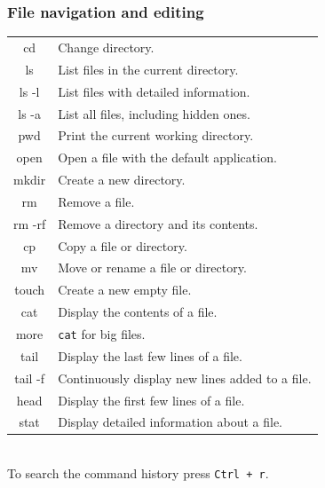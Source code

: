 \documentclass[10pt]{article}
\begin{document}
\begin{multicols}{2}
\subsubsection{File navigation and editing}
\begin{tabular}{C L}
    cd      & Change directory. \\
    ls      & List files in the current directory. \\
    ls -l   & List files with detailed information. \\
    ls -a   & List all files, including hidden ones. \\
    pwd     & Print the current working directory. \\
    open    & Open a file with the default application. \\
    mkdir   & Create a new directory. \\
    rm      & Remove a file. \\
    rm -rf  & Remove a directory and its contents. \\
    cp      & Copy a file or directory. \\
    mv      & Move or rename a file or directory. \\
    touch   & Create a new empty file. \\
    cat     & Display the contents of a file. \\
    more    & \texttt{cat} for big files.\\
    tail    & Display the last few lines of a file. \\
    tail -f & Continuously display new lines added to a file. \\
    head    & Display the first few lines of a file. \\
    stat    & Display detailed information about a file. \\
\end{tabular}\\
\footnotesize{To search the command history press \texttt{Ctrl + r}.}


\end{multicols}
\end{document}
